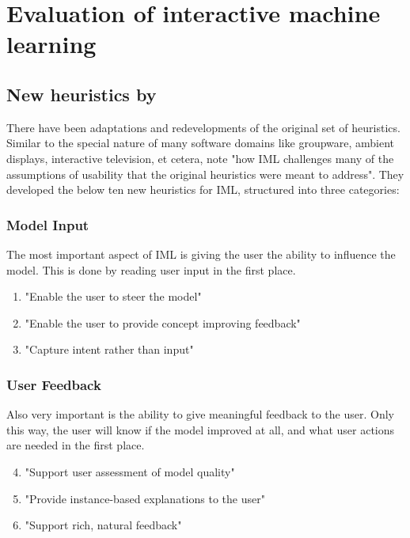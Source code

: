 \documentclass[sigchi]{acmart}
\begin{document}
\section{Evaluation of interactive machine learning}

\subsection{New heuristics by \citeauthor{imlheur2018}}

There have been adaptations and redevelopments of the original set of heuristics. Similar to the special nature of many software domains like groupware\cite{groupwareheur2001}, ambient displays, interactive television, et cetera, \citeauthor{imlheur2018} note "how IML challenges many of the assumptions of usability that the original heuristics were meant to address"\cite{imlheur2018}. They developed the below ten new heuristics for IML, structured into three categories:

\subsubsection{Model Input}
The most important aspect of IML is giving the user the ability to influence the model. This is done by reading user input in the first place.
\begin{enumerate}
    \item "Enable the user to steer the model" \\
    \item "Enable the user to provide concept improving feedback" \\
    \item "Capture intent rather than input"\cite{imlheur2018} \\
\end{enumerate}

\subsubsection{User Feedback}
Also very important is the ability to give meaningful feedback to the user. Only this way, the user will know if the model improved at all, and what user actions are needed in the first place.
\begin{enumerate}
    \setcounter{enumi}{3}
    \item "Support user assessment of model quality" \\
    \item "Provide instance-based explanations to the user" \\
    \item "Support rich, natural feedback"\cite{imlheur2018} \\
\end{enumerate}
\end{document}
